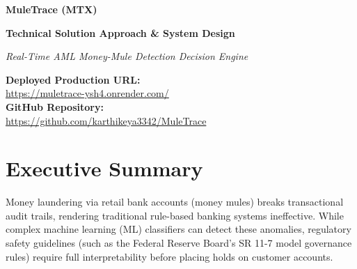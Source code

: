 \documentclass[11pt,a4paper]{article}
\begin{document}
\begin{titlepage}
    \centering
    \vspace*{3.0cm}
    
    \noindent
    \begin{minipage}{\textwidth}
        {\Huge \bfseries \color{navy} MuleTrace (MTX) \par}
        \vspace{0.4cm}
        {\Large \bfseries \color{darkgray} Technical Solution Approach \& System Design \par}
        \vspace{0.2cm}
        {\large \textit{Real-Time AML Money-Mule Detection Decision Engine} \par}
    \end{minipage}
    
    \vspace{4.0cm}
    
    \noindent
    \begin{minipage}{\textwidth}
        \textbf{Deployed Production URL:}\\
        \href{https://muletrace-ysh4.onrender.com/}{https://muletrace-ysh4.onrender.com/}\\
        \vspace{0.6cm}
        \textbf{GitHub Repository:}\\
        \href{https://github.com/karthikeya3342/MuleTrace}{https://github.com/karthikeya3342/MuleTrace}
    \end{minipage}
\end{titlepage}

\tableofcontents
\newpage
{}

\section{Executive Summary}
Money laundering via retail bank accounts (money mules) breaks transactional audit trails, rendering traditional rule-based banking systems ineffective. While complex machine learning (ML) classifiers can detect these anomalies, regulatory safety guidelines (such as the Federal Reserve Board's SR 11-7 model governance rules) require full interpretability before placing holds on customer accounts.
\end{document}

